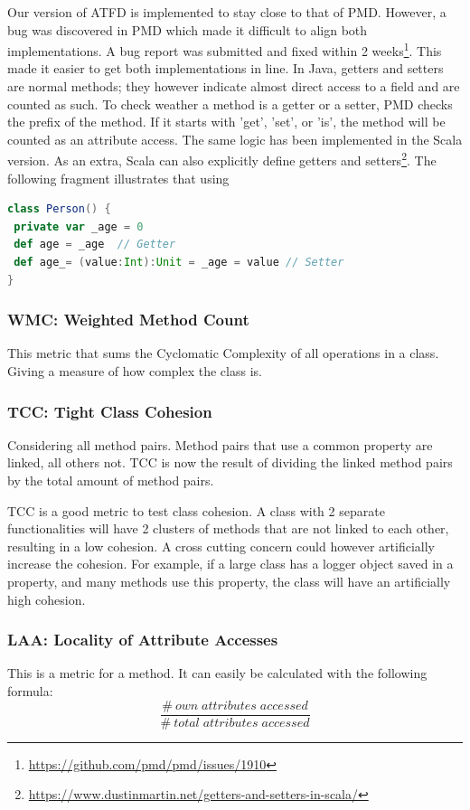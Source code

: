 \documentclass[onecolumn]{article}
\begin{document}
Our version of ATFD is implemented to stay close to that of PMD. However, a bug was discovered in PMD which made it difficult to align both implementations. A bug report was submitted and fixed within 2 weeks\footnote{\url{https://github.com/pmd/pmd/issues/1910}}. This made it easier to get both implementations in line. 
In Java, getters and setters are normal methods; they however indicate almost direct access to a field and are counted as such. To check weather a method is a getter or a setter, PMD checks the prefix of the method. If it starts with 'get', 'set', or 'is', the method will be counted as an attribute access. The same logic has been implemented in the Scala version. As an extra, Scala can also explicitly define getters and setters\footnote{\url{https://www.dustinmartin.net/getters-and-setters-in-scala/}}. The following fragment illustrates that using 
\begin{lstlisting}[language=scala]
class Person() {
 private var _age = 0
 def age = _age  // Getter
 def age_= (value:Int):Unit = _age = value // Setter
}
\end{lstlisting}


\subsubsection{WMC: Weighted Method Count} \label{metric_WMC}
This metric that sums the Cyclomatic Complexity of all operations in a class. Giving a measure of how complex the class is.


\subsubsection{TCC: Tight Class Cohesion} \label{metric_TCC}
Considering all method pairs. Method pairs that use a common property are linked, all others not. TCC is now the result of dividing the linked method pairs by the total amount of method pairs.

TCC is a good metric to test class cohesion. A class with 2 separate functionalities will have 2 clusters of methods that are not linked to each other, resulting in a low cohesion. A cross cutting concern could however artificially increase the cohesion. For example, if a large class has a logger object saved in a property, and many methods use this property, the class will have an artificially high cohesion.


\subsubsection{LAA: Locality of Attribute Accesses} \label{metric_LAA}
This is a metric for a method. It can easily be calculated with the following formula:
\[\frac{\#\:own\;attributes\;accessed}{\#\:total\;attributes\;accessed} \]
\end{document}
